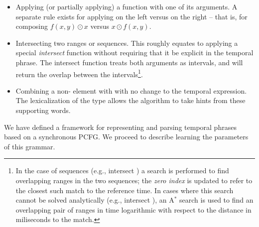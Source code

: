 \begin{itemize}
	\setlength{\itemsep}{-5pt} 
	\item Applying (or partially applying) a function with one of its
			arguments.
		A separate rule exists for applying on the left versus on the right --
		that is, for composing $f(x,y) \odot x$ versus $x \odot f(x,y)$.
	\item Intersecting two ranges or sequences.
		This roughly equates to applying a special \textit{intersect} function
			without requiring that it be explicit in the temporal phrase.
		The intersect function treats both arguments as intervals, and will return
			the overlap between the intervals\footnote{
				In the case of sequences (e.g.,  intersect ) a
					search is performed to find overlapping ranges in the two sequences;
					the \textit{zero index} is updated to refer to the closest such
					match to the reference time.
				In cases where this search cannot be solved analytically
					(e.g.,  intersect ), an A$^{*}$
					search is used to find an overlapping pair of ranges
					in time logarithmic with respect to
					the distance in miliseconds to the match.
		}.

	\item Combining a non- element with  with no change to the
			temporal expression.
		The lexicalization of the  type allows the algorithm
			to take hints from these supporting words.
\end{itemize}

We have defined a framework for representing and parsing temporal phrases
	based on a synchronous PCFG.
We proceed to describe learning the parameters of this grammar.

